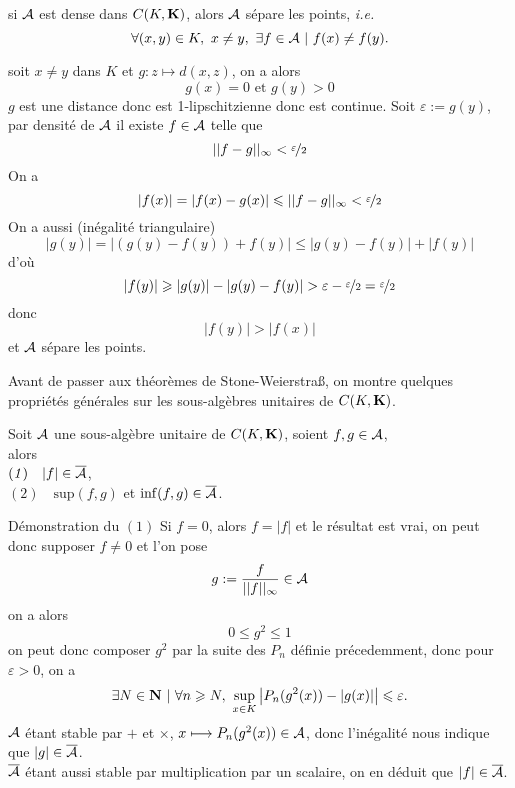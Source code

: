 \documentclass[a4paper,11pt, twoside]{article}
\begin{document}
\begin{RQ}
  si $\mathcal A$ est dense dans $C(K,\mathbf K)$, alors $\mathcal A$ sépare les points, \emph{i.e.}
  $$\forall (x,y)\in K,\ x\neq y,\ \exists f\in\A\ |\ f(x)\neq f(y).$$
\end{RQ}


\begin{Proof}
  soit $x\neq y$ dans $K$ et $g:z\longmapsto d(x,z)$, on a alors 
  $$g(x)=0\text{ et }g(y)>0$$
  $g$ est une distance donc est 1-lipschitzienne donc est continue. Soit $\varepsilon:=g(y)$, par densité de $\mathcal A$ il existe $f\in \mathcal A$ telle que 
  $$||f-g||_{\infty}<\displaystyle\nicefrac{\varepsilon}{2}$$
  On a 
  $$|f(x)|=|f(x)-g(x)|\leqslant||f-g||_{\infty}<\displaystyle\nicefrac{\varepsilon}{2}$$
  On a aussi (inégalité triangulaire)
  $$|g(y)|=|(g(y)-f(y))+f(y)|\leqslant|g(y)-f(y)|+|f(y)|$$
  d'où
  $$|f(y)|\geqslant |g(y)|-|g(y)-f(y)|>\varepsilon-\dstyle\nicefrac{\varepsilon}{2}=\dstyle\nicefrac{\varepsilon}{2}$$
  donc 
  $$|f(y)|>|f(x)|$$
  et $\mathcal A$ sépare les points.
\end{Proof}


Avant de passer aux théorèmes de Stone-Weierstra\ss, on montre quelques propriétés générales sur les sous-algèbres unitaires de $C(K,\mathbf K)$.


\begin{prop}
  Soit $\mathcal A$ une sous-algèbre unitaire de $C(K,\mathbf K)$, soient $f,g\in\mathcal A$,\\
  
  alors\\
  $(\mathit 1)\quad |f|\in\overline{\mathcal A}$,\\[1em]
  $(\mathit 2)\quad \mathrm{sup}(f,g)$ et $\mathrm{inf}(f,g)\in\overline{\mathcal A}$.
\end{prop}


\begin{ProofC}{Démonstration du $(\mathit1)$}
  Si $f=0$, alors $f=|f|$ et le résultat est vrai, on peut donc supposer $f\neq 0$ et l'on pose 
  $$g:=\frac{f}{||f||_{\infty}}\in\mathcal A$$
  on a alors 
  $$0\leqslant g^2\leqslant 1$$
  on peut donc composer $g^2$ par la suite des $P_n$ définie précedemment, donc pour $\varepsilon>0$, on a 
  $$\exists N\in\mathbf N\ |\ \forall n\geqslant N,\ \underset{x\in K}{\mathrm{sup}}\left|P_n(g^2(x))-|g(x)|\right|\leqslant\varepsilon.$$
  $\mathcal A$ étant stable par $+$ et $\times$, $x\longmapsto P_n(g^2(x))\in\mathcal A$, donc l'inégalité nous indique que $|g|\in\overline{\mathcal A}$.\\
  $\overline{\mathcal A}$ étant aussi stable par multiplication par un scalaire, on en déduit que $|f|\in\overline{\mathcal A}$.
\end{ProofC}
\end{document}
